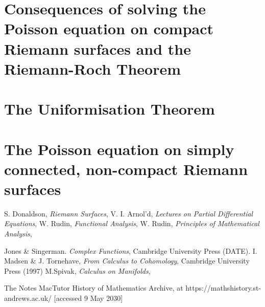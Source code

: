 \documentclass[11pt]{report}
\theoremstyle{definition}
\begin{document}
\section{Consequences of solving the Poisson equation on compact Riemann surfaces and the Riemann-Roch Theorem}
\section{The Uniformisation Theorem}
\section{The Poisson equation on simply connected, non-compact Riemann surfaces}

%
\begin{thebibliography}{99}
 S. Donaldson, {\em Riemann Surfaces},
 V. I. Arnol'd, {\em Lectures on Partial Differential Equations},
 W. Rudin, {\em Functional Analysis},
 W. Rudin, {\em Principles of Mathematical Analysis}, 

 Jones \& Singerman. {\em Complex Functions}, Cambridge University Press (DATE).
 I. Madsen \& J. Tornehave, {\em From Calculus to Cohomology}, Cambridge University Press (1997)
 M.Spivak, {\em Calculus on Manifolds}, 

 The Notes
%
 MacTutor History of Mathematics Archive, at https://mathshistory.st-andrews.ac.uk/ [accessed 9 May 2030]


\end{thebibliography}
\end{document}
